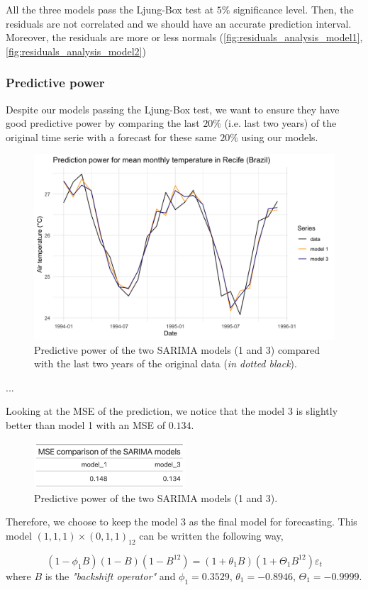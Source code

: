 All the three models pass the Ljung-Box test at $5\%$ significance level. Then, the residuals are not correlated and we should have an accurate prediction interval. Moreover, the residuals are more or less normals (\autoref{fig:residuals_analysis_model1}, \autoref{fig:residuals_analysis_model2})

\subsubsection{Predictive power}

Despite our models passing the Ljung-Box test, we want to ensure they have good predictive power by comparing the last $20\%$ (i.e. last two years) of the original time serie with a forecast for these same $20\%$ using our models.

\begin{figure}[H]
	\centering
	\includegraphics{figures/box_jenkins/predictive_power.png}
	\caption{Predictive power of the two SARIMA models (1 and 3) compared with the last two years of the original data (\textit{in dotted black}).}
	\label{fig:predictive-power}
\end{figure}

...

Looking at the MSE of the prediction, we notice that the model 3 is slightly better than model 1 with an MSE of $0.134$.
\begin{figure}[H]
	\centering
	\includegraphics[width=0.5\textwidth]{figures/box_jenkins/predictive_power_mse.png}
	\caption{Predictive power of the two SARIMA models (1 and 3).}
	\label{fig:predictive-power-mse}
\end{figure}

Therefore, we choose to keep the model $3$ as the final model for forecasting. This model $(1, 1, 1) \times (0, 1, 1)_{12}$ can be written the following way,

\begin{equation} \label{eq:final-model}
	(1 - \phi_1 B)(1 - B)(1 - B^{12}) = (1 + \theta_1 B)(1 + \Theta_1 B^{12}) \varepsilon_t
\end{equation}
where $B$ is the \textit{"backshift operator"} and $\phi_1 = 0.3529$, $\theta_1 = -0.8946$, $\Theta_1 = -0.9999$.